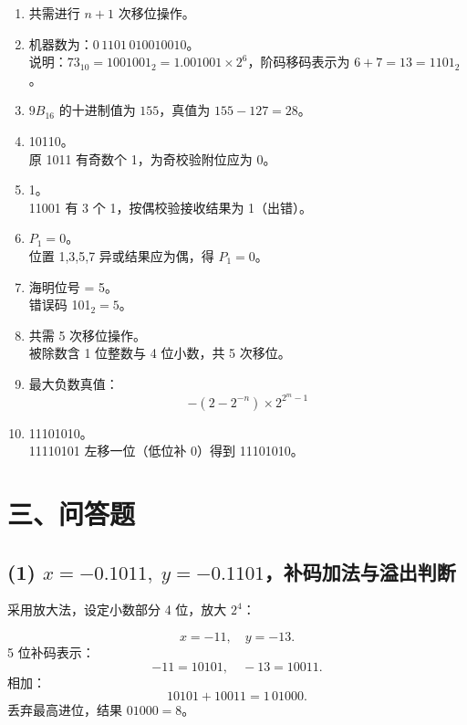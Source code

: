 \documentclass[12pt]{ctexart}
\begin{document}
\begin{enumerate}
  \item 共需进行 $n+1$ 次移位操作。

  \item 机器数为：$\boxed{0\,1101\,010010010}$。\\
  说明：$73_{10} = 1001001_2 = 1.001001 \times 2^6$，阶码移码表示为 $6+7=13=1101_2$。

  \item $9B_{16}$ 的十进制值为 $155$，真值为 $155-127=28$。

  \item 10110。\\
  原 1011 有奇数个 1，为奇校验附位应为 0。

  \item 1。\\
  11001 有 3 个 1，按偶校验接收结果为 1（出错）。

  \item $P_1 = 0$。\\
  位置 1,3,5,7 异或结果应为偶，得 $P_1=0$。

  \item 海明位号 = 5。\\
  错误码 101$_2=5$。

  \item 共需 5 次移位操作。\\
  被除数含 1 位整数与 4 位小数，共 5 次移位。

  \item 最大负数真值：
  \[
    -\left(2 - 2^{-n}\right) \times 2^{2^{m}-1}
  \]

  \item 11101010。\\
  11110101 左移一位（低位补 0）得到 11101010。
\end{enumerate}

\section*{三、问答题}

\subsection*{(1) $x=-0.1011,\;y=-0.1101$，补码加法与溢出判断}

采用放大法，设定小数部分 4 位，放大 $2^4$：

\[
x=-11,\quad y=-13.
\]
5 位补码表示：
\[
-11 = 10101,\quad -13 = 10011.
\]
相加：
\[
10101 + 10011 = 1\,01000.
\]
丢弃最高进位，结果 $01000=8$。
\end{document}
